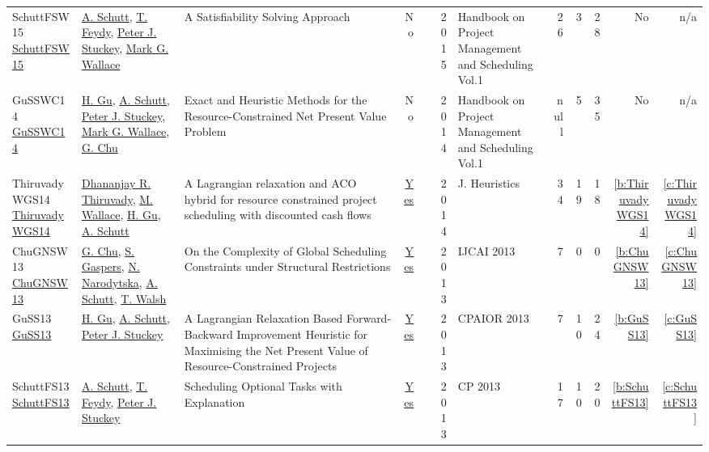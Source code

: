 {\begin{longtable}{>{\raggedright\arraybackslash}p{3cm}>{\raggedright\arraybackslash}p{6cm}>{\raggedright\arraybackslash}p{6.5cm}rrrp{2.5cm}rrrrr}
SchuttFSW15 \href{https://doi.org/10.1007/978-3-319-05443-8_7}{SchuttFSW15} & \hyperref[auth:a125]{A. Schutt}, \hyperref[auth:a155]{T. Feydy}, \hyperref[auth:a126]{Peter J. Stuckey}, \hyperref[auth:a156]{Mark G. Wallace} & A Satisfiability Solving Approach & No & \cite{SchuttFSW15} & 2015 & Handbook on Project Management and Scheduling Vol.1 & 26 & 3 & 28 & No & n/a\\
GuSSWC14 \href{http://dx.doi.org/10.1007/978-3-319-05443-8_14}{GuSSWC14} & \hyperref[auth:a342]{H. Gu}, \hyperref[auth:a125]{A. Schutt}, \hyperref[auth:a126]{Peter J. Stuckey}, \hyperref[auth:a156]{Mark G. Wallace}, \hyperref[auth:a349]{G. Chu} & Exact and Heuristic Methods for the Resource-Constrained Net Present Value Problem & No & \cite{GuSSWC14} & 2014 & Handbook on Project Management and Scheduling Vol.1 & null & 5 & 35 & No & n/a\\
ThiruvadyWGS14 \href{https://doi.org/10.1007/s10732-014-9260-3}{ThiruvadyWGS14} & \hyperref[auth:a402]{Dhananjay R. Thiruvady}, \hyperref[auth:a117]{M. Wallace}, \hyperref[auth:a342]{H. Gu}, \hyperref[auth:a125]{A. Schutt} & A Lagrangian relaxation and {ACO} hybrid for resource constrained project scheduling with discounted cash flows & \href{works/ThiruvadyWGS14.pdf}{Yes} & \cite{ThiruvadyWGS14} & 2014 & J. Heuristics & 34 & 19 & 18 & \ref{b:ThiruvadyWGS14} & \ref{c:ThiruvadyWGS14}\\
ChuGNSW13 \href{http://www.aaai.org/ocs/index.php/IJCAI/IJCAI13/paper/view/6878}{ChuGNSW13} & \hyperref[auth:a349]{G. Chu}, \hyperref[auth:a805]{S. Gaspers}, \hyperref[auth:a806]{N. Narodytska}, \hyperref[auth:a125]{A. Schutt}, \hyperref[auth:a279]{T. Walsh} & On the Complexity of Global Scheduling Constraints under Structural Restrictions & \href{works/ChuGNSW13.pdf}{Yes} & \cite{ChuGNSW13} & 2013 & IJCAI 2013 & 7 & 0 & 0 & \ref{b:ChuGNSW13} & \ref{c:ChuGNSW13}\\
GuSS13 \href{https://doi.org/10.1007/978-3-642-38171-3\_24}{GuSS13} & \hyperref[auth:a342]{H. Gu}, \hyperref[auth:a125]{A. Schutt}, \hyperref[auth:a126]{Peter J. Stuckey} & A Lagrangian Relaxation Based Forward-Backward Improvement Heuristic for Maximising the Net Present Value of Resource-Constrained Projects & \href{works/GuSS13.pdf}{Yes} & \cite{GuSS13} & 2013 & CPAIOR 2013 & 7 & 10 & 24 & \ref{b:GuSS13} & \ref{c:GuSS13}\\
SchuttFS13 \href{https://doi.org/10.1007/978-3-642-40627-0\_47}{SchuttFS13} & \hyperref[auth:a125]{A. Schutt}, \hyperref[auth:a155]{T. Feydy}, \hyperref[auth:a126]{Peter J. Stuckey} & Scheduling Optional Tasks with Explanation & \href{works/SchuttFS13.pdf}{Yes} & \cite{SchuttFS13} & 2013 & CP 2013 & 17 & 10 & 20 & \ref{b:SchuttFS13} & \ref{c:SchuttFS13}\\

\end{longtable}}
